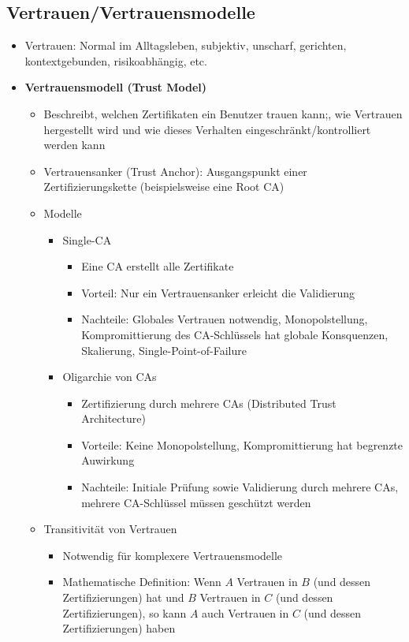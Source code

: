 \subsection{Vertrauen/Vertrauensmodelle}
\begin{itemize}
	\item Vertrauen: Normal im Alltagsleben, subjektiv, unscharf, gerichten, kontextgebunden, risikoabhängig, etc.
	\item \textbf{Vertrauensmodell (Trust Model)}
	\begin{itemize}
		\item Beschreibt, welchen Zertifikaten ein Benutzer trauen kann;, wie Vertrauen hergestellt wird und wie dieses Verhalten eingeschränkt/kontrolliert werden kann
		\item Vertrauensanker (Trust Anchor): Ausgangspunkt einer Zertifizierungskette (beispielsweise eine Root CA)
		\item Modelle
		\begin{itemize}
			\item Single-CA
			\begin{itemize}
				\item Eine CA erstellt alle Zertifikate
				\item Vorteil: Nur ein Vertrauensanker erleicht die Validierung
				\item Nachteile: Globales Vertrauen notwendig, Monopolstellung, Kompromittierung des CA-Schlüssels hat globale Konsquenzen, Skalierung, Single-Point-of-Failure
			\end{itemize}
			\item Oligarchie von CAs
			\begin{itemize}
				\item Zertifizierung durch mehrere CAs (Distributed Trust Architecture)
				\item Vorteile: Keine Monopolstellung, Kompromittierung hat begrenzte Auwirkung
				\item Nachteile: Initiale Prüfung sowie Validierung durch mehrere CAs, mehrere CA-Schlüssel müssen geschützt werden
			\end{itemize}
		\end{itemize}
		\item Transitivität von Vertrauen
		\begin{itemize}
			\item Notwendig für komplexere Vertrauensmodelle
			\item Mathematische Definition: Wenn \(A\) Vertrauen in \(B\) (und dessen Zertifizierungen) hat und \(B\) Vertrauen in \(C\) (und dessen Zertifizierungen), so kann \(A\) auch Vertrauen in \(C\) (und dessen Zertifizierungen) haben

\end{itemize}
\end{itemize}
\end{itemize}
